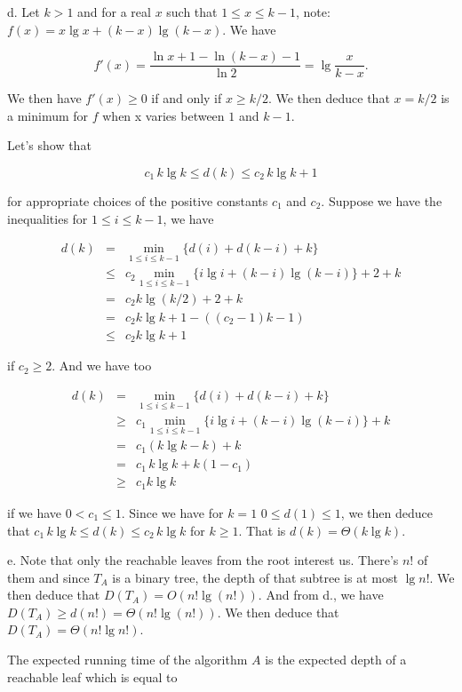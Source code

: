 \documentclass[a4paper,12pt]{article}
\newcommand{\subpar}[1]{\medskip \noindent #1.}
\begin{document}
\subpar{d}  Let $k>1$ and for a real $x$ such that $1 \le x\le k-1$,
note: $f(x) = x \lg x + (k-x)\lg (k-x)$.  We have

\[  f'(x) = \frac{\ln x + 1 - \ln(k-x) - 1}{\ln 2} = \lg\frac{x}{k-x}.\]

We then have $f'(x) \ge 0$ if and only if $x \ge k/2$.  We then deduce
that $x = k/2$ is a minimum for $f$ when x varies between $1$ and
$k-1$.

\medskip
Let's show that

\[ c_1\,k\lg k \le d(k) \le c_2\,k\lg k + 1\]

for appropriate choices of the positive constants $c_1$ and $c_2$.
Suppose we have the inequalities for $1\le i\le k-1$, we have

\begin{eqnarray*}
  d(k) &=& \min_{1\le i\le k-1}\{ d(i) + d(k-i) + k\} \\
  &\le& c_2 \min_{1\le i\le k-1}\{i\lg i + (k-i)\lg (k-i) \} + 2
  + k\\
  &=& c_2 k \lg (k/2) + 2 + k \\
  &=& c_2 k \lg k + 1 - ((c_2 - 1)k - 1) \\
  &\le& c_2 k\lg k + 1
\end{eqnarray*}

if $c_2 \ge 2$.  And we have too

\begin{eqnarray*}
  d(k) &=& \min_{1\le i\le k-1}\{ d(i) + d(k-i) + k\} \\
  &\ge& c_1 \min_{1\le i\le k-1}\{ i \lg i + (k-i)\lg(k-i)\} + k \\
  &=& c_1 (k \lg k - k) + k \\
  &=& c_1\,k \lg k + k(1-c_1) \\
  &\ge& c_1k\lg k
\end{eqnarray*}

if we have $0 < c_1 \le 1$.  Since we have for $k=1$ $0 \le d(1) \le
1$, we then deduce that $c_1\,k\lg k \le d(k) \le c_2\,k\lg k$ for
$k\ge 1$.  That is $d(k) = \Theta(k\lg k)$.

\subpar{e} Note that only the reachable leaves from the root interest
us.  There's $n!$ of them and since $T_A$ is a binary tree, the depth
of that subtree is at most $\lg n!$.  We then deduce that $D(T_A) =
O(n!  \lg(n!))$.  And from d., we have $D(T_A) \ge d(n!) = \Theta(n!
\lg (n!))$.  We then deduce that $D(T_A) = \Theta(n! \lg n!)$.

The expected running time of the algorithm $A$ is the expected depth
of a reachable leaf which is equal to
\end{document}

